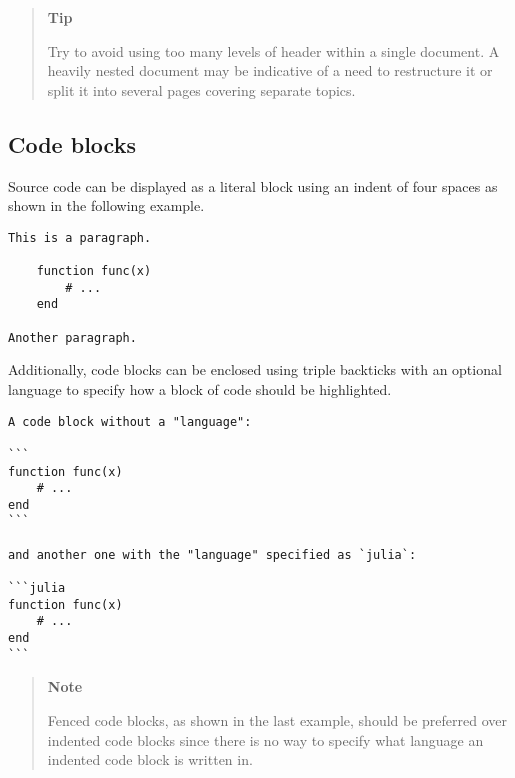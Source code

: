 \begin{quote}
\textbf{Tip}

Try to avoid using too many levels of header within a single document. A heavily nested document may be indicative of a need to restructure it or split it into several pages covering separate topics.

\end{quote}


\hypertarget{9246544299434150790}{}


\subsection{Code blocks}



Source code can be displayed as a literal block using an indent of four spaces as shown in the following example.




\begin{lstlisting}
This is a paragraph.

    function func(x)
        # ...
    end

Another paragraph.
\end{lstlisting}



Additionally, code blocks can be enclosed using triple backticks with an optional {\textquotedbl}language{\textquotedbl} to specify how a block of code should be highlighted.




\begin{lstlisting}
A code block without a "language":

```
function func(x)
    # ...
end
```

and another one with the "language" specified as `julia`:

```julia
function func(x)
    # ...
end
```
\end{lstlisting}



\begin{quote}
\textbf{Note}

{\textquotedbl}Fenced{\textquotedbl} code blocks, as shown in the last example, should be preferred over indented code blocks since there is no way to specify what language an indented code block is written in.

\end{quote}


\hypertarget{12305052721486916392}{}


